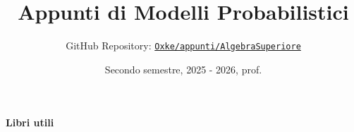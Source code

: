 

\title{Appunti di Modelli Probabilistici}
\author{GitHub Repository:
\href{https://github.com/Oxke/appunti/tree/main/AlgebraSuperiore}{\texttt{Oxke/appunti/AlgebraSuperiore}}}

\date{Secondo semestre, 2025 \-- 2026, prof.}


\maketitle
\paragraph{Libri utili}

\tableofcontents






